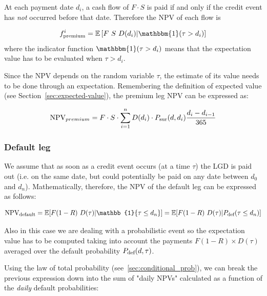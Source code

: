 At each payment date $d_i$, a cash flow of $F\cdot S$ is paid if and only if the credit event has \emph{not} occurred before that date. Therefore the NPV of each flow is

\begin{equation}
f_{\textrm{premium}}^i = \mathbb{E}\left[F~S~D(d_i)|\mathbbm{1}(\tau > d_i) \right]
\end{equation}
where the indicator function $\mathbbm{1}(\tau > d_i)$ means that the expectation value has to be evaluated when $\tau > d_i$. 

Since the NPV depends on the random variable $\tau$, the estimate of its value needs to be done through an expectation.
Remembering the definition of expected value (see Section~\ref{sec:expected-value}), %
the premium leg NPV can be expressed as:

\begin{equation}
\textrm{NPV}_{premium} = F\cdot S \cdot \sum_{i=1}^{n} D(d_i) \cdot P_{\text{sur}}(d, d_i)\frac{d_i-d_{i-1}}{365}
\end{equation}

\subsubsection{Default leg}
\label{default-leg}

We assume that as soon as a credit event occurs (at a time $\tau$) the LGD is paid out (i.e. on the same date, but could potentially be paid on any date between $d_0$ and $d_n$). Mathematically, therefore, the NPV of the default leg can be expressed as follows:

\begin{equation}
\mathrm{NPV_{default}} =\mathbb{E}[F(1-R)~D(\tau)|\mathbb{1} \{\tau \leq d_n\} ] = \mathbb{E}[F(1-R)~D(\tau)|\Pdef(\tau \leq d_n) ]
\end{equation}

Also in this case we are dealing with a probabilistic event so the expectation value has to be computed taking into account the payments $F(1-R)\times D(\tau)$ averaged over the default probability $P_{\text{def}}(d, \tau)$. 

Using the law of total probability (see~\ref{sec:conditional_prob}), we can break the previous expression down into the sum of "daily NPVs" calculated as a function of the \emph{daily} default probabilities:

